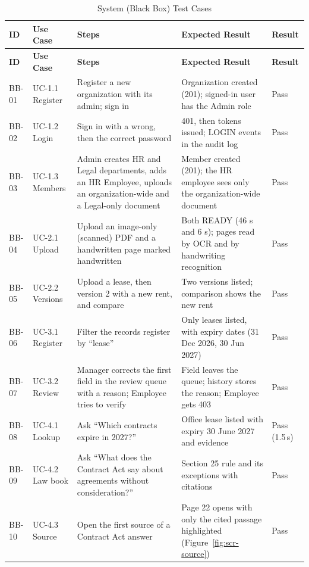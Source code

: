\begin{longtable}{|p{1.15cm}|p{2.0cm}|p{4.6cm}|p{5.0cm}|p{1.3cm}|}
\caption{System (Black Box) Test Cases}\label{tab:blackbox}\\ \hline
\textbf{ID} & \textbf{Use Case} & \textbf{Steps} & \textbf{Expected Result} & \textbf{Result} \\ \hline
\endfirsthead
\hline
\textbf{ID} & \textbf{Use Case} & \textbf{Steps} & \textbf{Expected Result} & \textbf{Result} \\ \hline
\endhead
BB-01 & UC-1.1 Register & Register a new organization with its admin; sign in & Organization created (201); signed-in user has the Admin role & Pass \\ \hline
BB-02 & UC-1.2 Login & Sign in with a wrong, then the correct password & 401, then tokens issued; LOGIN events in the audit log & Pass \\ \hline
BB-03 & UC-1.3 Members & Admin creates HR and Legal departments, adds an HR Employee, uploads an organization-wide and a Legal-only document & Member created (201); the HR employee sees only the organization-wide document & Pass \\ \hline
BB-04 & UC-2.1 Upload & Upload an image-only (scanned) PDF and a handwritten page marked handwritten & Both READY (46 s and 6 s); pages read by OCR and by handwriting recognition & Pass \\ \hline
BB-05 & UC-2.2 Versions & Upload a lease, then version 2 with a new rent, and compare & Two versions listed; comparison shows the new rent & Pass \\ \hline
BB-06 & UC-3.1 Register & Filter the records register by ``lease'' & Only leases listed, with expiry dates (31 Dec 2026, 30 Jun 2027) & Pass \\ \hline
BB-07 & UC-3.2 Review & Manager corrects the first field in the review queue with a reason; Employee tries to verify & Field leaves the queue; history stores the reason; Employee gets 403 & Pass \\ \hline
BB-08 & UC-4.1 Lookup & Ask ``Which contracts expire in 2027?'' & Office lease listed with expiry 30 June 2027 and evidence & Pass (1.5\,s) \\ \hline
BB-09 & UC-4.2 Law book & Ask ``What does the Contract Act say about agreements without consideration?'' & Section 25 rule and its exceptions with citations & Pass \\ \hline
BB-10 & UC-4.3 Source & Open the first source of a Contract Act answer & Page 22 opens with only the cited passage highlighted (Figure~\ref{fig:scr-source}) & Pass \\ \hline

\end{longtable}
